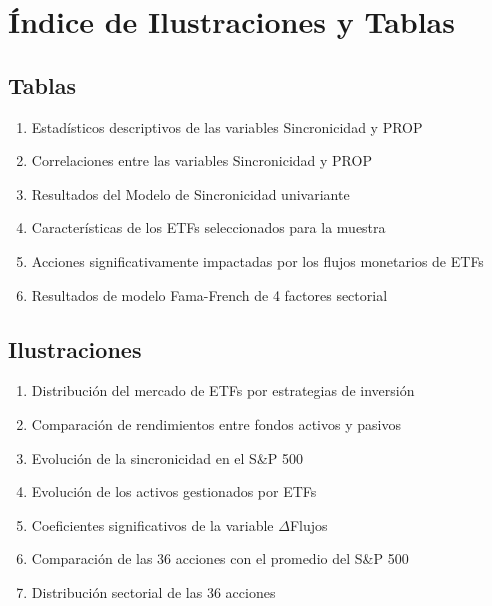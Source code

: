 \documentclass[12pt,a4paper]{article}
\begin{document}
\newpage

\tableofcontents

\newpage

\section*{Índice de Ilustraciones y Tablas}

\subsection*{Tablas}
\begin{enumerate}[label=Tabla \arabic*., leftmargin=2cm, labelsep=0.5cm]
\item Estadísticos descriptivos de las variables Sincronicidad y PROP
\item Correlaciones entre las variables Sincronicidad y PROP
\item Resultados del Modelo de Sincronicidad univariante
\item Características de los ETFs seleccionados para la muestra
\item Acciones significativamente impactadas por los flujos monetarios de ETFs
\item Resultados de modelo Fama-French de 4 factores sectorial
\end{enumerate}

\subsection*{Ilustraciones}
\begin{enumerate}[label=Ilustración \arabic*., leftmargin=3cm, labelsep=0.5cm]
\item Distribución del mercado de ETFs por estrategias de inversión
\item Comparación de rendimientos entre fondos activos y pasivos
\item Evolución de la sincronicidad en el S\&P 500
\item Evolución de los activos gestionados por ETFs
\item Coeficientes significativos de la variable $\Delta$Flujos
\item Comparación de las 36 acciones con el promedio del S\&P 500
\item Distribución sectorial de las 36 acciones
\end{enumerate}
\end{document}

